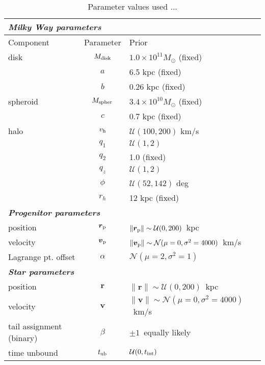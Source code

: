 \documentclass[letterpaper,12pt,preprint]{aastex}
\newcommand{\bs}{\boldsymbol}
\newcommand{\sat}{{\rm p}}
\newcommand{\tub}{t_{\rm ub}}
\newcommand{\tint}{t_{\rm int}}
\newcommand{\pshock}{P_{\rm shock}}
\newcommand{\vhalo}{v_{\rm h}}
\begin{document}
\begin{table}[h]
\begin{center}
	\begin{tabular}{l c l} \toprule
		\multicolumn{3}{l}{{\bf \emph{Milky Way parameters}}} \\
		\toprule
		Component & Parameter & Prior \\\toprule
		disk & $M_{\rm disk}$ & $1.0\times10^{11}M_\odot$ (fixed) \\ 
		& $a$ & 6.5 kpc (fixed)\\
		& $b$ & 0.26 kpc (fixed)\\
		\midrule
		spheroid & $M_{\rm spher}$ & $3.4\times10^{10}M_\odot$ (fixed)\\ 
		& $c$ & 0.7 kpc (fixed)\\
		\midrule
		halo & $\vhalo$ & $\mathcal{U}(100,200)$ km/s \\
		& $q_1$ & $\mathcal{U}(1,2)$\\
		& $q_2$ & 1.0 (fixed)\\
		& $q_z$ & $\mathcal{U}(1,2)$\\
		& $\phi$ & $\mathcal{U}(52,142)$ deg\\
		& $r_h$ & 12 kpc (fixed)\\
		\toprule
		\multicolumn{3}{l}{{\bf \emph{Progenitor parameters}}} \\
		\toprule
		position & $\bs{r}_\sat$ & $\|\bs{r}_\sat\|\sim\mathcal{U}(0,200)$~kpc \\
		velocity & $\bs{v}_\sat$ & $\|\bs{v}_\sat\|\sim\mathcal{N}(\mu=0,\sigma^2=4000)$~km/s\\
		Lagrange pt. offset & $\alpha$ & $\mathcal{N}(\mu=2,\sigma^2=1)$\\
		\toprule
		\multicolumn{3}{l}{{\bf \emph{Star parameters}}} \\
		\toprule
		position & $\bs{r}$ & $\|\bs{r}\|\sim\mathcal{U}(0,200)$~kpc \\
		velocity & $\bs{v}$ & $\|\bs{v}\|\sim\mathcal{N}(\mu=0,\sigma^2=4000)$~km/s\\
		tail assignment (binary) & $\beta$ & $\pm1$~equally likely\\ %
		time unbound & $\tub$ & $\mathcal{U}(0,\tint)$\\ %
		\bottomrule
		\end{tabular}
	\caption{Parameter values used ...\label{tbl:params}}
\end{center}
\end{table}
\end{document}
